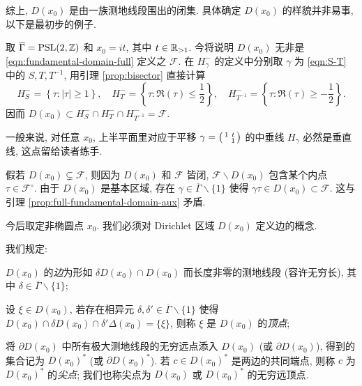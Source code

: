 综上, $D(x_0)$ 是由一族测地线段围出的闭集. 具体确定 $D(x_0)$ 的样貌并非易事, 以下是最初步的例子.
\begin{example}\label{eg:Dirichlet-domain-full}
	取 $\overline{\Gamma} = \operatorname{PSL}(2,\mathbb{Z})$ 和 $x_0 = it$, 其中 $t \in \mathbb{R}_{> 1}$. 今将说明 $D(x_0)$ 无非是 \eqref{eqn:fundamental-domain-full} 定义之 $\mathcal{F}$. 在 $H_\gamma^-$ 的定义中分别取 $\gamma$ 为 \eqref{eqn:S-T} 中的 $S, T, T^{-1}$, 用引理 \ref{prop:bisector} 直接计算
	\begin{equation*}
		H_S^- = \left\{ \tau : |\tau| \geq 1 \right\}, \quad H_T^- = \left\{ \tau : \Re(\tau) \leq \frac{1}{2} \right\}, \quad H_{T^{-1}}^- = \left\{ \tau : \Re(\tau) \geq -\frac{1}{2} \right\}.
	\end{equation*}
	因而 $D(x_0) \subset H_S^- \cap H_T^- \cap H_{T^{-1}}^- = \mathcal{F}$.

	一般来说, 对任意 $x_0$, 上半平面里对应于平移 $\gamma = \bigl(\begin{smallmatrix} 1 & t \\  & 1 \end{smallmatrix}\bigr)$ 的中垂线 $H_\gamma$ 必然是垂直线, 这点留给读者练手.
	
	假若 $D(x_0) \subsetneq \mathcal{F}$, 则因为 $D(x_0)$ 和 $\mathcal{F}$ 皆闭, $\mathcal{F} \smallsetminus D(x_0)$ 包含某个内点 $\tau \in \mathcal{F}^\circ$. 由于 $D(x_0)$ 是基本区域, 存在 $\gamma \in \overline{\Gamma} \smallsetminus \{1\}$ 使得 $\gamma\tau \in D(x_0) \subset \mathcal{F}$. 这与引理 \ref{prop:full-fundamental-domain-aux} 矛盾.
\end{example}

今后取定非椭圆点 $x_0$. 我们必须对 Dirichlet 区域 $D(x_0)$ 定义边的概念.
\begin{definition}[边, 顶点, 尖点]\label{def:sides}   
	我们规定:
	\begin{compactitem}
		\item $D(x_0)$ 的\emph{边}为形如 $\delta D(x_0) \cap D(x_0)$ 而长度非零的测地线段 (容许无穷长), 其中 $\delta \in \overline{\Gamma} \smallsetminus \{1\}$;
		\item 设 $\xi \in D(x_0)$, 若存在相异元 $\delta, \delta' \in \overline{\Gamma} \smallsetminus \{1\}$ 使得 $D(x_0) \cap \delta D(x_0) \cap \delta' \Delta(x_0) = \{\xi\}$, 则称 $\xi$ 是 $D(x_0)$ 的\emph{顶点};
		\item 将 $\partial D(x_0)$ 中所有极大测地线段的无穷远点添入 $D(x_0)$ (或 $\partial D(x_0)$), 得到的集合记为 $D(x_0)^*$ (或 $\partial D(x_0)^*$). 若 $c \in D(x_0)^*$ 是两边的共同端点, 则称 $c$ 为 $D(x_0)^*$ 的\emph{尖点}; 我们也称尖点为 $D(x_0)$ 或 $D(x_0)^*$ 的无穷远顶点.
	\end{compactitem}
\end{definition}

